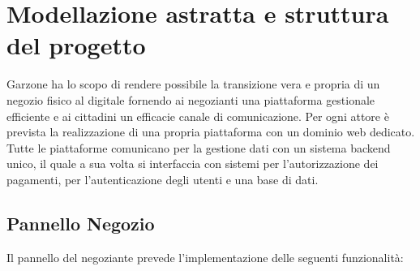 \section{Modellazione astratta e struttura del progetto}
Garzone ha lo scopo di rendere possibile la transizione vera e propria di un negozio fisico al digitale fornendo ai negozianti una piattaforma gestionale efficiente e ai cittadini un efficacie canale di comunicazione. Per ogni attore è prevista la realizzazione di una propria piattaforma con un dominio web dedicato. \\Tutte le piattaforme comunicano per la gestione dati con un sistema backend unico, il quale a sua volta si interfaccia con sistemi per l'autorizzazione dei pagamenti, per l'autenticazione degli utenti e una base di dati.
\subsection{Pannello Negozio}
Il pannello del negoziante prevede l'implementazione delle seguenti funzionalità:
